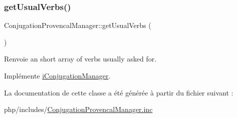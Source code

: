 \subsubsection{\texorpdfstring{get\+Usual\+Verbs()}{getUsualVerbs()}}
{\footnotesize\ttfamily Conjugation\+Provencal\+Manager\+::get\+Usual\+Verbs (\begin{DoxyParamCaption}{ }\end{DoxyParamCaption})}

\begin{DoxyReturn}{Renvoie}
an short array of verbs usually asked for. 
\end{DoxyReturn}


Implémente \hyperlink{interfacei_conjugation_manager_a2a7ed39313c1c92ef5c01c88895de36e}{i\+Conjugation\+Manager}.



La documentation de cette classe a été générée à partir du fichier suivant \+:\begin{DoxyCompactItemize}
\item 
php/includes/\hyperlink{_conjugation_provencal_manager_8inc}{Conjugation\+Provencal\+Manager.\+inc}\end{DoxyCompactItemize}
